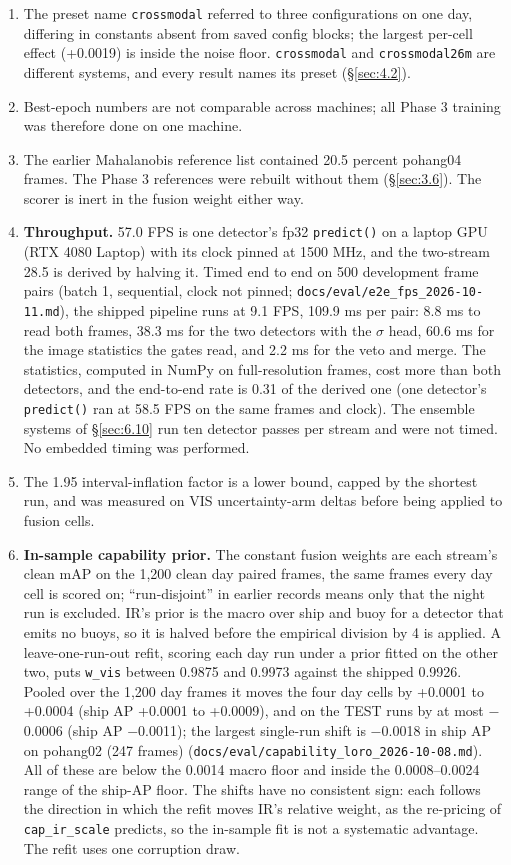 \documentclass[10pt]{article}
\begin{document}
\begin{enumerate}
\item The preset name \texttt{crossmodal} referred to three configurations on one day, differing in constants absent from saved config blocks; the largest per-cell effect (+0.0019) is inside the noise floor. \texttt{crossmodal} and \texttt{crossmodal26m} are different systems, and every result names its preset (\S\ref{sec:4.2}).
\item Best-epoch numbers are not comparable across machines; all Phase 3 training was therefore done on one machine.
\item The earlier Mahalanobis reference list contained 20.5 percent pohang04 frames. The Phase 3 references were rebuilt without them (\S\ref{sec:3.6}). The scorer is inert in the fusion weight either way.
\item \textbf{Throughput.} 57.0 FPS is one detector's fp32 \texttt{predict()} on a laptop GPU (RTX 4080 Laptop) with its clock pinned at 1500 MHz, and the two-stream 28.5 is derived by halving it. Timed end to end on 500 development frame pairs (batch 1, sequential, clock not pinned; \texttt{docs/\allowbreak{}eval/\allowbreak{}e2e\_\allowbreak{}fps\_\allowbreak{}2026-10-11.md}), the shipped pipeline runs at 9.1 FPS, 109.9 ms per pair: 8.8 ms to read both frames, 38.3 ms for the two detectors with the $\sigma$ head, 60.6 ms for the image statistics the gates read, and 2.2 ms for the veto and merge. The statistics, computed in NumPy on full-resolution frames, cost more than both detectors, and the end-to-end rate is 0.31 of the derived one (one detector's \texttt{predict()} ran at 58.5 FPS on the same frames and clock). The ensemble systems of \S\ref{sec:6.10} run ten detector passes per stream and were not timed. No embedded timing was performed.
\item The 1.95 interval-inflation factor is a lower bound, capped by the shortest run, and was measured on VIS uncertainty-arm deltas before being applied to fusion cells.
\item \textbf{In-sample capability prior.} The constant fusion weights are each stream's clean mAP on the 1,200 clean day paired frames, the same frames every day cell is scored on; ``run-disjoint'' in earlier records means only that the night run is excluded. IR's prior is the macro over ship and buoy for a detector that emits no buoys, so it is halved before the empirical division by 4 is applied. A leave-one-run-out refit, scoring each day run under a prior fitted on the other two, puts \texttt{w\_\allowbreak{}vis} between 0.9875 and 0.9973 against the shipped 0.9926. Pooled over the 1,200 day frames it moves the four day cells by +0.0001 to +0.0004 (ship AP +0.0001 to +0.0009), and on the TEST runs by at most $-$0.0006 (ship AP $-$0.0011); the largest single-run shift is $-$0.0018 in ship AP on pohang02 (247 frames) (\texttt{docs/\allowbreak{}eval/\allowbreak{}capability\_\allowbreak{}loro\_\allowbreak{}2026-10-08.md}). All of these are below the 0.0014 macro floor and inside the 0.0008--0.0024 range of the ship-AP floor. The shifts have no consistent sign: each follows the direction in which the refit moves IR's relative weight, as the re-pricing of \texttt{cap\_\allowbreak{}ir\_\allowbreak{}scale} predicts, so the in-sample fit is not a systematic advantage. The refit uses one corruption draw.

\end{enumerate}
\end{document}
